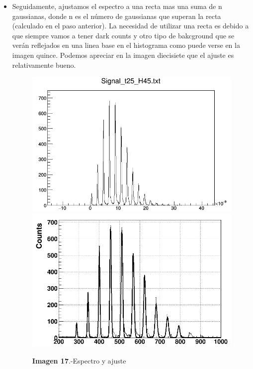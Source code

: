 \begin{itemize}
\newpage
\item {} Seguidamente, ajustamos el espectro a una recta mas una suma de n gaussianas, donde n es el número de gaussianas que superan la recta (calculado en el paso anterior). La necesidad de utilizar una recta es debido a que siempre vamos a tener dark counts y otro tipo de bakcground que se verán reflejados en una linea base en el histograma como puede verse en la imagen quince. Podemos apreciar en la imagen diecisiete que el ajuste es relativamente bueno.

\begin{figure}[htb]
\centering
{
\includegraphics[scale=0.2]{Espectroo.png} 
}
{
\includegraphics[scale=0.2]{AjusteEspectro.png} 
}
\caption{\textbf{Imagen 17}.-Espectro y ajuste}
\end{figure} 


\end{itemize}
